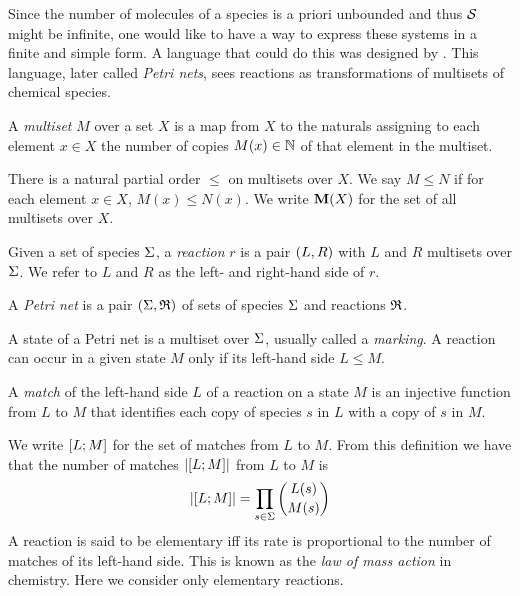 Since the number of molecules of a species
is a priori unbounded and thus $\mathcal{S}$ might be infinite,
one would like to have a way to express
these systems in a finite and simple form.
A language that could do this was designed by \citet{petri}.
This language, later called \emph{Petri nets},
sees reactions as transformations of
multisets of chemical species.

\begin{definition}
  A \emph{multiset} $M$ over a set $X$ is a map from $X$ to
  the naturals assigning to each element $x \in X$
  the number of copies $M(x) \in \mathbb{N}$ of that element
  in the multiset.
\end{definition}

There is a natural partial order $\leqslant$ on multisets over $X$.
We say $M \leqslant N$ if for each element $x \in X$,
$M(x) \leqslant N(x)$.
We write $\mathbf{M}(X)$ for the set of all multisets over $X$.

\begin{definition}
  Given a set of species $\Sigma$,
  a \emph{reaction} $r$ is a pair $\left(L,R\right)$
  with $L$ and $R$ multisets over $\Sigma$.
  We refer to $L$ and $R$ as the left- and right-hand side of $r$.
\end{definition}

\begin{definition}%
  A \emph{Petri net} is a pair $\left(\Sigma, \mathfrak{R}\right)$ of
  sets of species $\Sigma$ and reactions $\mathfrak{R}$.
\end{definition}

A state of a Petri net is a multiset over $\Sigma$,
usually called a \emph{marking}.
A reaction can occur in a given state $M$ only if
its left-hand side $L \leqslant M$.

\begin{definition}
  A \emph{match} of the left-hand side $L$ of a reaction
  on a state $M$ is an injective function from $L$ to $M$
  that identifies each copy of species $s$ in $L$
  with a copy of $s$ in $M$.
\end{definition}

We write $\left[L;M\right]$ for the set of matches from $L$ to $M$.
From this definition we have that the number of matches
$\left\lvert \left[L;M\right] \right\rvert$ from $L$ to $M$ is
\[ \left\lvert \left[L;M\right] \right\rvert = \prod_{s \in \Sigma} \binom{L(s)}{M(s)} \]
A reaction is said to be elementary iff its rate is
proportional to the number of matches of its left-hand side.
This is known as the \emph{law of mass action} in chemistry.
Here we consider only elementary reactions.

